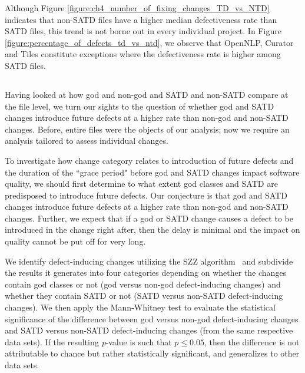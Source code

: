 Although Figure \ref{figure:ch4_number_of_fixing_changes_TD_vs_NTD} indicates that non-SATD files have a higher median defectiveness rate than SATD files, this trend is not borne out in every individual project. In Figure \ref{figure:percentage_of_defects_td_vs_ntd}, we observe that OpenNLP, Curator and Tiles constitute exceptions where the defectiveness rate is higher among SATD files.


\subsection*{\chapterIVrqII}


Having looked at how god and non-god and SATD and non-SATD compare at the file level, we turn our sights to the question of whether god and SATD changes introduce future defects at a higher rate than non-god and non-SATD changes. Before, entire files were the objects of our analysis; now we require an analysis tailored to assess individual changes.


To investigate how change category relates to introduction of future defects and the duration of the ``grace period" before god and SATD changes impact software quality, we should first determine to what extent god classes and SATD are predisposed to introduce future defects. Our conjecture is that god and SATD changes introduce future defects at a higher rate than non-god and non-SATD changes. Further, we expect that if a god or SATD change causes a defect to be introduced in the change right after, then the delay is minimal and the impact on quality cannot be put off for very long.


We identify defect-inducing changes utilizing the SZZ algorithm~\cite{sliwerski-msr-2005} and subdivide the results it generates into four categories depending on whether the changes contain god classes or not (god versus non-god defect-inducing changes) and whether they contain SATD or not (SATD versus non-SATD defect-inducing changes). We then apply the Mann-Whitney test \cite{mann1947test} to evaluate the statistical significance of the difference between god versus non-god defect-inducing changes and SATD versus non-SATD defect-inducing changes (from the same respective data sets). If the resulting \textit{p}-value is such that $p \le 0.05$, then the difference is not attributable to chance but rather statistically significant, and generalizes to other data sets.


